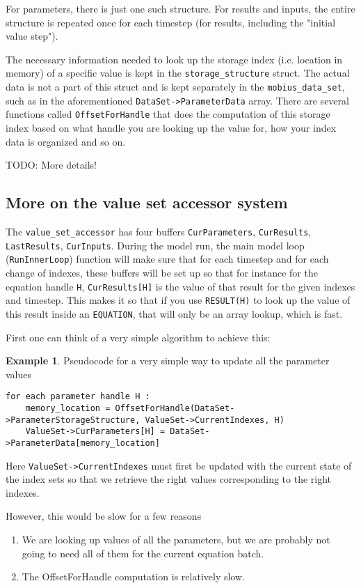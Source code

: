 \documentclass[11pt]{article}
\theoremstyle{definition}
\newtheorem{myexample}{Example}
\newenvironment{example}%
  {\begin{lrbox}{\examplebox}%
   \begin{minipage}{\dimexpr\linewidth-2\fboxsep}
   \begin{myexample}}%
  {\end{myexample}%
   \end{minipage}%
   \end{lrbox}%
   \begin{trivlist}
     \item[]\colorbox{silver}{\usebox\examplebox}
   \end{trivlist}}
\begin{document}
For parameters, there is just one such structure. For results and inputs, the entire structure is repeated once for each timestep (for results, including the "initial value step").

The necessary information needed to look up the storage index (i.e. location in memory) of a specific value is kept in the {\tt storage\_structure} struct. The actual data is not a part of this struct and is kept separately in the {\tt mobius\_data\_set}, such as in the aforementioned {\tt DataSet->ParameterData} array. There are several functions called {\tt OffsetForHandle} that does the computation of this storage index based on what handle you are looking up the value for, how your index data is organized and so on.

TODO: More details!


\subsection{More on the value set accessor system}

The {\tt value\_set\_accessor} has four buffers {\tt CurParameters}, {\tt CurResults}, {\tt LastResults}, {\tt CurInputs}. During the model run, the main model loop ({\tt RunInnerLoop}) function will make sure that for each timestep and for each change of indexes, these buffers will be set up so that for instance for the equation handle {\tt H}, {\tt CurResults[H]} is the value of that result for the given indexes and timestep. This makes it so that if you use {\tt RESULT(H)} to look up the value of this result inside an {\tt EQUATION}, that will only be an array lookup, which is fast.

First one can think of a very simple algorithm to achieve this:
\begin{example}
Pseudocode for a very simple way to update all the parameter values
\begin{lstlisting}[style = mycpp]
for each parameter handle H :
	memory_location = OffsetForHandle(DataSet->ParameterStorageStructure, ValueSet->CurrentIndexes, H)
	ValueSet->CurParameters[H] = DataSet->ParameterData[memory_location]
\end{lstlisting}
Here {\tt ValueSet->CurrentIndexes} must first be updated with the current state of the index sets so that we retrieve the right values corresponding to the right indexes.
\end{example}

However, this would be slow for a few reasons
\begin{enumerate}[i]
\item We are looking up values of all the parameters, but we are probably not going to need all of them for the current equation batch.
\item The OffsetForHandle computation is relatively slow.
\end{enumerate}
\end{document}
